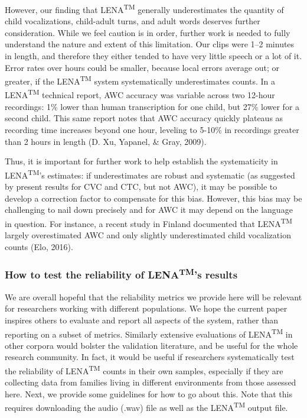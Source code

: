 \documentclass[english,floatsintext,man]{apa6}
\begin{document}
However, our finding that LENA\textsuperscript{TM} generally
underestimates the quantity of child vocalizations, child-adult turns,
and adult words deserves further consideration. While we feel caution is
in order, further work is needed to fully understand the nature and
extent of this limitation. Our clips were 1--2 minutes in length, and
therefore they either tended to have very little speech or a lot of it.
Error rates over hours could be smaller, because local errors average
out; or greater, if the LENA\textsuperscript{TM} system systematically
underestimates counts. In a LENA\textsuperscript{TM} technical report,
AWC accuracy was variable across two 12-hour recordings: 1\% lower than
human transcription for one child, but 27\% lower for a second child.
This same report notes that AWC accuracy quickly plateaus as recording
time increases beyond one hour, leveling to 5-10\% in recordings greater
than 2 hours in length (D. Xu, Yapanel, \& Gray, 2009).

Thus, it is important for further work to help establish the
systematicity in LENA\textsuperscript{TM}'s estimates: if underestimates
are robust and systematic (as suggested by present results for CVC and
CTC, but not AWC), it may be possible to develop a correction factor to
compensate for this bias. However, this bias may be challenging to nail
down precisely and for AWC it may depend on the language in question.
For instance, a recent study in Finland documented that
LENA\textsuperscript{TM} largely overestimated AWC and only slightly
underestimated child vocalization counts (Elo, 2016).

\subsubsection{\texorpdfstring{How to test the reliability of
LENA\textsuperscript{TM}'s
results}{How to test the reliability of LENATM's results}}\label{how-to-test-the-reliability-of-lenatms-results}

We are overall hopeful that the reliability metrics we provide here will
be relevant for researchers working with different populations. We hope
the current paper inspires others to evaluate and report all aspects of
the system, rather than reporting on a subset of metrics. Similarly
extensive evaluations of LENA\textsuperscript{TM} in other corpora would
bolster the validation literature, and be useful for the whole research
community. In fact, it would be useful if researchers systematically
test the reliability of LENA\textsuperscript{TM} counts in their own
samples, especially if they are collecting data from families living in
different environments from those assessed here. Next, we provide some
guidelines for how to go about this. Note that this requires downloading
the audio (.wav) file as well as the LENA\textsuperscript{TM} output
file.
\end{document}
